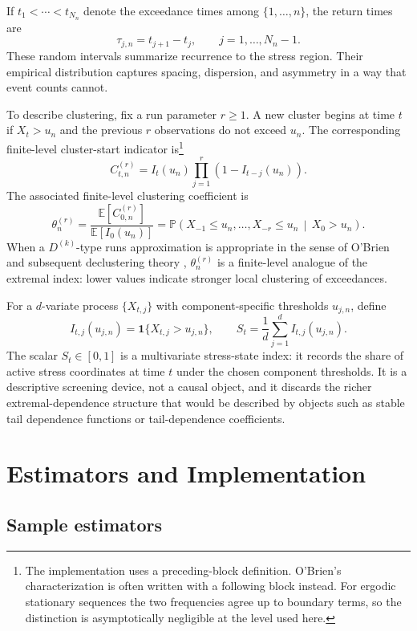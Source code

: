 \documentclass[11pt]{article}
\begin{document}
If $t_1<\cdots<t_{N_n}$ denote the exceedance times among $\{1,\dots,n\}$, the return times are
\[
\tau_{j,n}=t_{j+1}-t_j,\qquad j=1,\dots,N_n-1.
\]
These random intervals summarize recurrence to the stress region. Their empirical distribution captures spacing, dispersion, and asymmetry in a way that event counts cannot.

To describe clustering, fix a run parameter $r\geq 1$. A new cluster begins at time $t$ if $X_t>u_n$ and the previous $r$ observations do not exceed $u_n$. The corresponding finite-level cluster-start indicator is\footnote{The implementation uses a preceding-block definition. O'Brien's characterization is often written with a following block instead. For ergodic stationary sequences the two frequencies agree up to boundary terms, so the distinction is asymptotically negligible at the level used here.}
\[
C_{t,n}^{(r)}=I_t(u_n)\prod_{j=1}^{r}\left(1-I_{t-j}(u_n)\right).
\]
The associated finite-level clustering coefficient is
\[
\theta_n^{(r)}=\frac{\mathbb{E}[C_{0,n}^{(r)}]}{\mathbb{E}[I_0(u_n)]}
=\mathbb{P}\!\left(X_{-1}\le u_n,\dots,X_{-r}\le u_n \,\middle|\, X_0>u_n\right).
\]
When a $D^{(k)}$-type runs approximation is appropriate in the sense of O'Brien and subsequent declustering theory \cite{obrien1987,ferro2003}, $\theta_n^{(r)}$ is a finite-level analogue of the extremal index: lower values indicate stronger local clustering of exceedances.

For a $d$-variate process $\{X_{t,j}\}$ with component-specific thresholds $u_{j,n}$, define
\[
I_{t,j}(u_{j,n})=\mathbf{1}\{X_{t,j}>u_{j,n}\},
\qquad
S_t=\frac{1}{d}\sum_{j=1}^{d} I_{t,j}(u_{j,n}).
\]
The scalar $S_t \in [0,1]$ is a multivariate stress-state index: it records the share of active stress coordinates at time $t$ under the chosen component thresholds. It is a descriptive screening device, not a causal object, and it discards the richer extremal-dependence structure that would be described by objects such as stable tail dependence functions or tail-dependence coefficients.

\section{Estimators and Implementation}

\subsection{Sample estimators}
\end{document}
